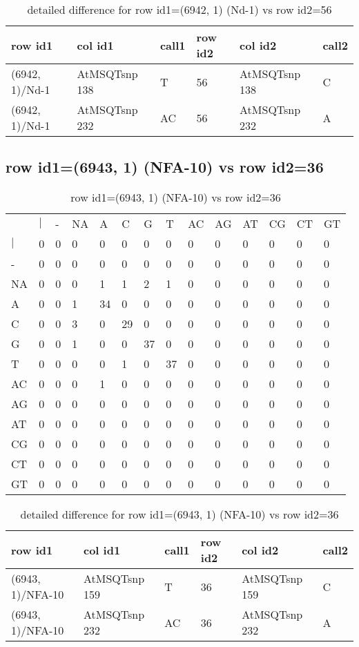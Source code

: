 \begin{center}
\begin{longtable}{|l|l|l|l|l|l|}
\caption{detailed difference for row id1=(6942, 1) (Nd-1) vs row id2=56} \label{table_dm145}\\
\hline
row id1&col id1&call1&row id2&col id2&call2\\
\hline
(6942, 1)/Nd-1&AtMSQTsnp 138&T&56&AtMSQTsnp 138&C\\
(6942, 1)/Nd-1&AtMSQTsnp 232&AC&56&AtMSQTsnp 232&A\\
\hline
\end{longtable}
\end{center}

\subsection{row id1=(6943, 1) (NFA-10) vs row id2=36}
\begin{center}
\begin{longtable}{|l|l|l|l|l|l|l|l|l|l|l|l|l|l|}
\caption{row id1=(6943, 1) (NFA-10) vs row id2=36} \label{table_dm146}\\
\hline
\\
\hline
&$|$&-&NA&A&C&G&T&AC&AG&AT&CG&CT&GT\\
$|$&0&0&0&0&0&0&0&0&0&0&0&0&0\\
-&0&0&0&0&0&0&0&0&0&0&0&0&0\\
NA&0&0&0&1&1&2&1&0&0&0&0&0&0\\
A&0&0&1&34&0&0&0&0&0&0&0&0&0\\
C&0&0&3&0&29&0&0&0&0&0&0&0&0\\
G&0&0&1&0&0&37&0&0&0&0&0&0&0\\
T&0&0&0&0&1&0&37&0&0&0&0&0&0\\
AC&0&0&0&1&0&0&0&0&0&0&0&0&0\\
AG&0&0&0&0&0&0&0&0&0&0&0&0&0\\
AT&0&0&0&0&0&0&0&0&0&0&0&0&0\\
CG&0&0&0&0&0&0&0&0&0&0&0&0&0\\
CT&0&0&0&0&0&0&0&0&0&0&0&0&0\\
GT&0&0&0&0&0&0&0&0&0&0&0&0&0\\
\hline
\end{longtable}
\end{center}

\begin{center}
\begin{longtable}{|l|l|l|l|l|l|}
\caption{detailed difference for row id1=(6943, 1) (NFA-10) vs row id2=36} \label{table_dm147}\\
\hline
row id1&col id1&call1&row id2&col id2&call2\\
\hline
(6943, 1)/NFA-10&AtMSQTsnp 159&T&36&AtMSQTsnp 159&C\\
(6943, 1)/NFA-10&AtMSQTsnp 232&AC&36&AtMSQTsnp 232&A\\
\hline
\end{longtable}
\end{center}

